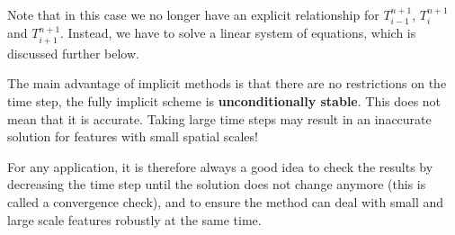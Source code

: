 \begin{center}

\end{center}



Note that in this case we no longer have an explicit relationship for 
$T^{n+1}_{i-1}$, $T^{n+1}_i$ and $T^{n+1}_{i+1}$.
Instead, we have to solve a {\color{olive}linear system of equations}, which is discussed further below.

The main advantage of implicit methods is that there are no restrictions on the time step,
the fully implicit scheme is {\bf unconditionally stable}.
This does not mean that it is accurate. 
Taking large time steps may result in an inaccurate solution for features with
small spatial scales!

For any application, it is therefore always a good idea to check the 
results by decreasing the time step
until the solution does not change anymore (this is called a {\color{olive}convergence check}), and 
to ensure the
method can deal with small and large scale features robustly at the same time.


